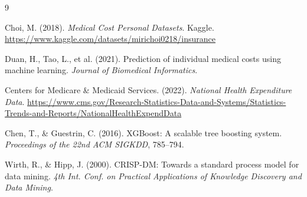 \documentclass[12pt, a4paper]{article}
\begin{document}
\begin{thebibliography}{9}

Choi, M. (2018). \textit{Medical Cost Personal Datasets}. Kaggle.
\url{https://www.kaggle.com/datasets/mirichoi0218/insurance}

Duan, H., Tao, L., et al. (2021). Prediction of individual medical costs
using machine learning. \textit{Journal of Biomedical Informatics}.

Centers for Medicare \& Medicaid Services. (2022).
\textit{National Health Expenditure Data}.
\url{https://www.cms.gov/Research-Statistics-Data-and-Systems/Statistics-Trends-and-Reports/NationalHealthExpendData}

Chen, T., \& Guestrin, C. (2016). XGBoost: A scalable tree boosting system.
\textit{Proceedings of the 22nd ACM SIGKDD}, 785--794.

Wirth, R., \& Hipp, J. (2000). CRISP-DM: Towards a standard process model
for data mining. \textit{4th Int. Conf. on Practical Applications of
Knowledge Discovery and Data Mining}.

\end{thebibliography}
\end{document}
